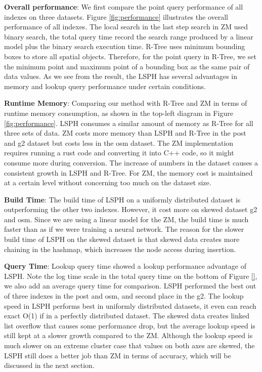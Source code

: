 \textbf{Overall performance}: We first compare the point query performance of all indexes on three datasets. Figure \ref{fig:performance} illustrates the overall performance of all indexes. The local search in the last step search in ZM used binary search, the total query time record the search range produced by a linear model plus the binary search execution time.  R-Tree uses minimum  bounding boxes to store all spatial objects. Therefore, for the point query in R-Tree, we set the minimum point and maximum point of a bounding box as the same pair of data values. As we see from the result, the LSPH has several advantages in memory and lookup query performance under certain conditions. 


\textbf{Runtime Memory}:
Comparing our method with R-Tree and ZM in terms of runtime memory consumption, as shown in the top-left diagram in Figure \ref{fig:performance}. LSPH consumes a similar amount of memory as R-Tree for all three sets of data. ZM costs more memory than LSPH and R-Tree in the post and g2 dataset but costs less in the osm dataset. The ZM implementation requires running a rust code and converting it into C++ code, so it might consume more during conversion. The increase of numbers in the dataset causes a consistent growth in LSPH and R-Tree. For ZM, the memory cost is maintained at a certain level without concerning too much on the dataset size. 


\textbf{Build Time}: The build time of LSPH on a uniformly distributed dataset is outperforming the other two indexes. However, it cost more on skewed dataset g2 and osm. Since we are using a linear model for the ZM, the build time is much faster than as if we were training a neural network. The reason for the slower build time of LSPH on the skewed dataset is that skewed data creates more chaining in the hashmap, which increases the node access during insertion. 



\textbf{Query Time}: Lookup query time showed a lookup performance advantage of LSPH. Note the log time scale in the total query time on the bottom of Figure \ref{}, we also add an average query time for comparison. LSPH performed the best out of three indexes in the post and osm, and second place in the g2. The lookup speed in LSPH performs best in uniformly distributed datasets, it even can reach exact O(1) if in a perfectly distributed dataset. The skewed data creates linked list overflow that causes some performance drop, but the average lookup speed is still kept at a slower growth compared to the ZM.  Although the lookup speed is much slower on an extreme cluster case that values on both axes are skewed, the LSPH still does a better job than ZM in terms of accuracy, which will be discussed in the next section.   


